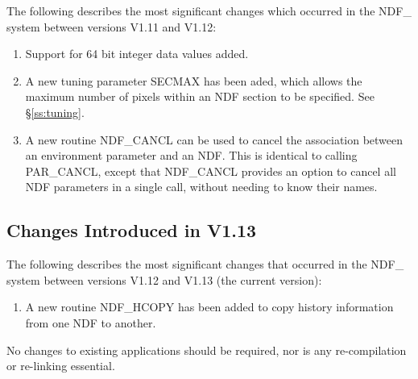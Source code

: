\documentclass[twoside,11pt,nolof]{starlink}
\begin{document}
The following describes the most significant changes which occurred in
the NDF\_ system between versions V1.11 and V1.12:

\begin{enumerate}

   \item Support for 64 bit integer data values added.

   \item A new tuning parameter SECMAX has been aded, which allows the
   maximum number of pixels within an NDF section to be specified. See
   \S\ref{ss:tuning}.

   \item A new routine NDF\_CANCL can be used to cancel the association
   between an environment parameter and an NDF. This is identical to
   calling PAR\_CANCL, except that NDF\_CANCL provides an option to
   cancel all NDF parameters in a single call, without needing to know
   their names.

\end{enumerate}


\subsection{Changes Introduced in V1.13}

The following describes the most significant changes that occurred in
the NDF\_ system between versions V1.12 and V1.13 (the current version):

\begin{enumerate}
   \item  A new routine NDF\_HCOPY has been added to copy history information
          from one NDF to another.
\end{enumerate}

No changes to existing applications should be required, nor is any
re-compilation or re-linking essential.

\end{document}
